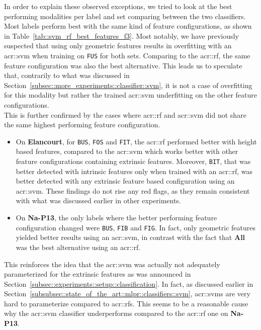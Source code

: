         In order to explain these observed exceptions, we tried to look at the best performing modalities per label and set comparing between the two classifiers.
        Most labels perform best with the same kind of feature configurations, as shown in Table~\ref{tab::svm_rf_best_features_f3}.
        Most notably, we have previously suspected that using only geometric features results in overfitting with an \gls{acr::svm} when training on \texttt{FUS} for both sets.
        Comparing to the \gls{acr::rf}, the same feature configuration was also the best alternative.
        This leads us to speculate that, contrarily to what was discussed in Section~\ref{subsec::more_experiments::classifier::svm}, it is not a case of overfitting for this modality but rather the trained \gls{acr::svm} underfitting on the other feature configurations.\\

        This is further confirmed by the cases where \gls{acr::rf} and \gls{acr::svm} did not share the same highest performing feature configuration.
        \begin{itemize}[label=\(\blacktriangleright\)]
            \item On \textbf{Elancourt}, for \texttt{BUS}, \texttt{FOS} and \texttt{FIT}, the \gls{acr::rf} performed better with height based features, compared to the \gls{acr::svm} which works better with other feature configurations containing extrinsic features.
                    Moreover, \texttt{BIT}, that was better detected with intrinsic features only when trained with an \gls{acr::rf}, was better detected with any extrinsic feature based configuration using an \gls{acr::svm}.
                    These findings do not rise any red flags, as they remain consistent with what was discussed earlier in other experiments.
            \item On \textbf{Na-P13}, the only labels where the better performing feature configuration changed were \texttt{BUS}, \texttt{FIB} and \texttt{FIG}.
                    In fact, only geometric features yielded better results using an \gls{acr::svm}, in contrast with the fact that \textbf{All} was the best alternative using an \gls{acr::rf}.
        \end{itemize}
        This reinforces the idea that the \gls{acr::svm} was actually not adequately parameterized for the extrinsic features as was announced in Section~\ref{subsec::experiments::setup::classification}.
        In fact, as discussed earlier in Section~\ref{subsubsec::state_of_the_art::mlpr::classifiers::svm}, \glspl{acr::svm} are very hard to parameterize compared to \glspl{acr::rf}.
        This seems to be a reasonable cause why the \gls{acr::svm} classifier underperforms compared to the \gls{acr::rf} one on \textbf{Na-P13}.
            
